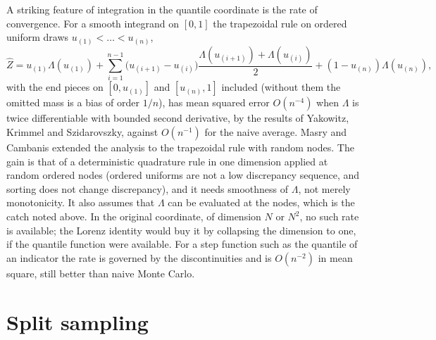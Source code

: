 \documentclass[11pt,twoside,openany]{book}
\theoremstyle{plain}
\theoremstyle{definition}
\theoremstyle{remark}
\begin{document}
A striking feature of integration in the quantile coordinate is the rate of convergence. For a smooth integrand on $[0, 1]$ the trapezoidal rule on ordered uniform draws $u_{(1)} < \dots < u_{(n)}$,
\[
\hat Z = u_{(1)} \Lambda(u_{(1)}) + \sum_{i=1}^{n-1} \big( u_{(i+1)} - u_{(i)} \big) \frac{\Lambda(u_{(i+1)}) + \Lambda(u_{(i)})}{2} + (1 - u_{(n)}) \Lambda(u_{(n)}) ,
\]
with the end pieces on $[0, u_{(1)}]$ and $[u_{(n)}, 1]$ included (without them the omitted mass is a bias of order $1/n$), has mean squared error $O(n^{-4})$ when $\Lambda$ is twice differentiable with bounded second derivative, by the results of Yakowitz, Krimmel and Szidarovszky, against $O(n^{-1})$ for the naive average. Masry and Cambanis extended the analysis to the trapezoidal rule with random nodes. The gain is that of a deterministic quadrature rule in one dimension applied at random ordered nodes (ordered uniforms are not a low discrepancy sequence, and sorting does not change discrepancy), and it needs smoothness of $\Lambda$, not merely monotonicity. It also assumes that $\Lambda$ can be evaluated at the nodes, which is the catch noted above. In the original coordinate, of dimension $N$ or $N^2$, no such rate is available; the Lorenz identity would buy it by collapsing the dimension to one, if the quantile function were available. For a step function such as the quantile of an indicator the rate is governed by the discontinuities and is $O(n^{-2})$ in mean square, still better than naive Monte Carlo.

\section{Split sampling}
\end{document}

